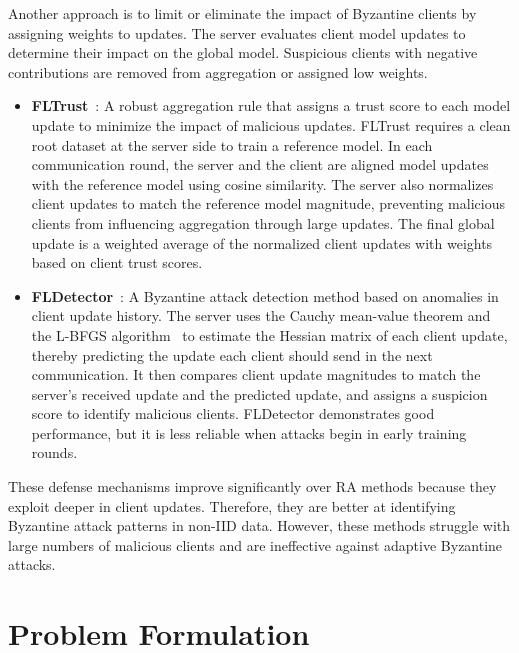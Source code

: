 \documentclass[journal]{IEEEtran}
\begin{document}
Another approach is to limit or eliminate the impact of Byzantine clients by assigning weights to updates. The server evaluates client model updates to determine their impact on the global model. Suspicious clients with negative contributions are removed from aggregation or assigned low weights.

\begin{itemize}
    \item \textbf{FLTrust}~\cite{cao2020fltrust}: A robust aggregation rule that assigns a trust score to each model update to minimize the impact of malicious updates. FLTrust requires a clean root dataset at the server side to train a reference model. In each communication round, the server and the client are aligned model updates with the reference model using cosine similarity. The server  also normalizes client updates to match the reference model magnitude, preventing malicious clients from influencing aggregation through large updates. The final global update is a weighted average of the normalized client updates with weights based on client trust scores.

    \item \textbf{FLDetector}~\cite{zhang2022fldetector}: A Byzantine attack detection method based on anomalies in client update history. The server uses the Cauchy mean-value theorem and the L-BFGS algorithm~\cite{liu1989limited} to estimate the Hessian matrix of each client update, thereby predicting the update each client should send in the next communication. It then compares client update magnitudes to match the server's received update and the predicted update, and assigns a suspicion score to identify malicious clients. FLDetector demonstrates good performance, but it is less reliable when attacks begin in early training rounds.
\end{itemize}

These defense mechanisms improve significantly over RA methods because they exploit deeper in client updates. Therefore, they are better at identifying Byzantine attack patterns in non-IID data. However, these methods struggle with large numbers of malicious clients and are ineffective against adaptive Byzantine attacks.

\section{Problem Formulation}
\label{sec:formulation}
\end{document}
